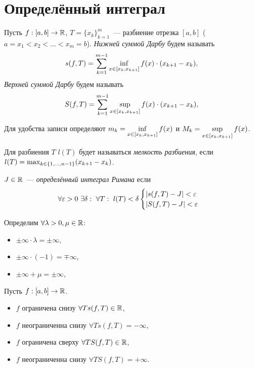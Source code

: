 \documentclass[../main.tex]{subfiles}
\begin{document}
\section{Определённый интеграл}
\begin{definition}
    Пусть $f: [a,b] \to \mathbb{R}$, $T = \{x_k\}_{k=1}^m$~--- разбиение отрезка $[a,b]$ ($a = x_1 < x_2 < \dots < x_m = b$). \emph{Нижней суммой Дарбу} будем называть 
    \begin{gather*}
        s(f, T) = \sum_{k=1}^{m-1} \operatorname*{inf}_{x\in[x_k,x_{k+1}]} f(x) \cdot (x_{k+1} - x_k),
    \end{gather*}
    \emph{Верхней суммой Дарбу} будем называть 
    \begin{gather*}
        S(f, T) = \sum_{k=1}^{m-1} \operatorname*{sup}_{x\in[x_k,x_{k+1}]} f(x) \cdot (x_{k+1} - x_k),
    \end{gather*}
\end{definition}
\begin{note}
    Для удобства записи определяют $m_k = \operatorname*{inf}\limits_{x\in[x_k,x_{k+1}]} f(x)$ и $M_k = \operatorname*{sup}\limits_{x\in[x_k,x_{k+1}]} f(x)$.
\end{note}

\begin{definition}
    Для разбиения $T$ $l(T)$ будет называться \emph{мелкость разбиения}, если $l(T) = \max_{k\in\{1, \ldots, n-1\}}(x_{k+1} - x_{k})$.
\end{definition}

\begin{definition}
    $J \in \mathbb{R}$~--- \emph{определённый интеграл Римана} если 
    \begin{gather*}
        \forall \varepsilon > 0\ \exists \delta:\ \forall T:\ l(T) < \delta \begin{cases}|s(f,T) - J| < \varepsilon \\ |S(f,T) - J| < \varepsilon\end{cases}
    \end{gather*}
\end{definition}

\begin{note}
    Определим $\forall \lambda > 0, \mu \in \mathbb{R}$:
    \begin{itemize}
        \item $\pm \infty \cdot \lambda = \pm \infty$,
        \item $\pm\infty \cdot (-1) = \mp\infty$,
        \item $\pm\infty + \mu = \pm\infty$,
    \end{itemize}
\end{note}

\begin{proposition}
    Пусть $f:[a,b] \to \mathbb{R}$.
    \begin{itemize}
        \item $f$ ограничена снизу \hence $\forall T s(f,T) \in \mathbb{R}$,
        \item $f$ неограниченна снизу \hence $\forall T s(f,T) = - \infty$,
        \item $f$ ограничена сверху \hence $\forall T S(f,T) \in \mathbb{R}$,
        \item $f$ неограниченна снизу \hence $\forall T S(f,T) = + \infty$.
    \end{itemize}
\end{proposition}
\end{document}
